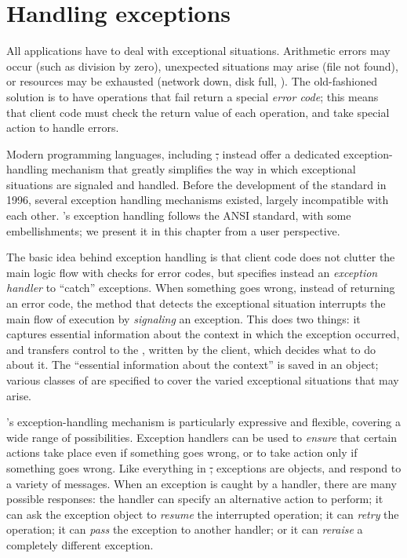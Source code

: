 \documentclass[a4paper,10pt,twoside]{book}
\begin{document}
	\renewcommand{\nnbb}[2]{} %
	\sloppy
\fi

\chapter{Handling exceptions}

All applications have to deal with exceptional situations.
Arithmetic errors may occur (such as division by zero), unexpected situations may arise (file not found), or resources may be exhausted (network down, disk full, \etc).
The old-fashioned solution is to have operations that fail return a special \emph{error code}; this means that client code must check the return value of each operation, and take special action to handle errors.

Modern programming languages, including \st, instead offer a dedicated exception-handling mechanism that greatly simplifies the way in which exceptional situations are signaled and handled.
Before the development of the  standard in 1996, several  exception handling mechanisms existed, largely incompatible with each other. \pharo's exception handling follows the ANSI standard, with some embellishments; we present it in this chapter from a user perspective.

The basic idea behind exception handling is that 
client code does not clutter the main logic flow with checks for error codes, but specifies instead an \emph{exception handler} to ``catch'' exceptions.
When something goes wrong, instead of returning an error code, the method that detects the exceptional situation interrupts the main flow of execution by  \emph{signaling} an exception.
This does two things: it captures essential information about the context in which the exception occurred, and transfers control to the , written by the client, which decides what to do about it.
The ``essential information about the context'' is saved in an  object; 
various classes of  are specified to cover the varied exceptional situations that may arise.

\pharo's exception-handling mechanism is particularly expressive and flexible, covering a wide range of possibilities. Exception handlers can be used to \emph{ensure} that certain actions take place even if something goes wrong, or to take action only if something goes wrong.
Like everything in \st, exceptions are objects, and respond to a variety of messages.
When an exception is caught by a handler, there are many possible responses: the  handler can specify an alternative action to perform; it can ask the exception object to \emph{resume} the interrupted operation; it can \emph{retry} the operation; it can \emph{pass} the exception to another handler; or it can \emph{reraise} a completely different exception.
\end{document}
